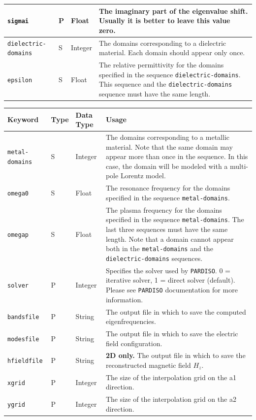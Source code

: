 \documentclass[11pt,a4paper,oneside]{article}
\begin{document}
\begin{center}
\begin{tabular}{| l | l | l | p{230pt} |}
	{\tt sigmai} & P & Float & The imaginary part of the eigenvalue shift. Usually it is better to leave this value zero.\\ \hline
	{\tt dielectric-domains} & S & Integer & The domains corresponding to a dielectric material. Each domain should appear only once. \\ \hline
	{\tt epsilon} & S & Float & The relative permittivity for the domains specified in the sequence {\tt dielectric-domains}. This sequence and the {\tt dielectric-domains} sequence must have the same length.  \\ 
    \hline
  \end{tabular}
\end{center}
\newpage
\begin{center}
  \begin{tabular}{| l | l | l | p{230pt} |}
    \hline
	Keyword & Type & Data Type & Usage \\ \hline
	{\tt metal-domains} & S & Integer & The domains corresponding to a metallic material. Note that the same domain may appear more than once in the sequence. In this case, the domain will be modeled with a multi-pole Lorentz model. \\ \hline
	{\tt omega0} & S & Float & The resonance frequency for the domains specified in the sequence {\tt metal-domains}.  \\ \hline
	{\tt omegap} & S & Float & The plasma frequency for the domains specified in the sequence {\tt metal-domains}. The last three sequences must have the same length. Note that a domain cannot appear both in the {\tt metal-domains} and the {\tt dielectric-domains} sequences. \\ \hline
	{\tt solver} & P & Integer & Specifies the solver used by {\tt PARDISO}. 0 = iterative solver, 1 = direct solver (default). Please see {\tt PARDISO} documentation for more information. \\ \hline
	{\tt bandsfile} & P & String & The output file in which to save the computed eigenfrequencies. \\ \hline
	{\tt modesfile} & P & String & The output file in which to save the electric field configuration. \\ \hline
	{\tt hfieldfile} & P & String & {\bf 2D only.} The output file in which to save the reconstructed magnetic field $H_z$. \\ \hline
	{\tt xgrid} & P & Integer & The size of the interpolation grid on the a1 direction. \\ \hline
	{\tt ygrid} & P & Integer & The size of the interpolation grid on the a2 direction. \\ \hline

\end{tabular}
\end{center}
\end{document}
